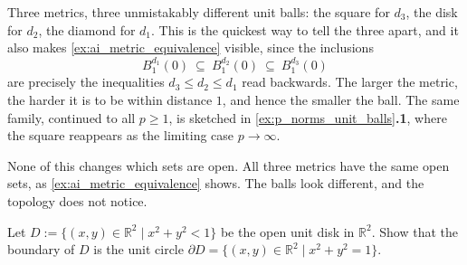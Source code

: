 \begin{remark}
\label{rem:unit_balls_distinguish_metrics}
Three metrics, three unmistakably different unit balls: the square for $d_3$, the disk for
$d_2$, the diamond for $d_1$. This is the quickest way to tell the three apart, and it also makes
\cref{ex:ai_metric_equivalence} visible, since the inclusions
\[B^{d_1}_1(0) \ \subseteq\ B^{d_2}_1(0) \ \subseteq\ B^{d_3}_1(0)\]
are precisely the inequalities $d_3 \leq d_2 \leq d_1$ read backwards. The larger the metric, the
harder it is to be within distance $1$, and hence the smaller the ball. The same family, continued
to all $p \geq 1$, is sketched in \cref{ex:p_norms_unit_balls}\textbf{.1}, where the square reappears as the
limiting case $p \to \infty$.

None of this changes which sets are open. All three metrics have the same open sets, as
\cref{ex:ai_metric_equivalence} shows. The balls look different, and the topology does not notice.
\end{remark}




\begin{aiexercise}
\label{ex:ai_disk_boundary}
Let $D := \{(x,y) \in \mathbb{R}^2 \mid x^2 + y^2 < 1\}$ be the open unit disk in $\mathbb{R}^2$. Show that the boundary of $D$ is the unit circle $\partial D = \{(x,y) \in \mathbb{R}^2 \mid x^2 + y^2 = 1\}$.
\end{aiexercise}





